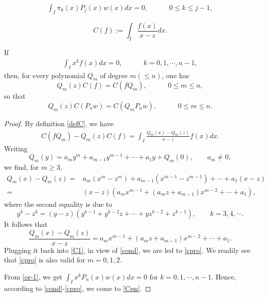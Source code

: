 \documentclass[10pt,a4paper]{amsart}
\begin{document}
\begin{align}\label{or-1}
\int_I\pi_k(x)P_{j}(x)w(x)dx=0, \quad\qquad 0\leq k\leq j-1,
\end{align}

	\begin{equation}\label{defC}		 C(f):=\int_{I}\frac{f(x)}{x-z}dx.
		\end{equation}

\begin{lemma}
If
\begin{align}\label{cond}
\int_{I}x^{k}f(x)dx=0,\quad\qquad k=0,1,\cdots,n-1,
\end{align}
then, for every polynomial $Q_{m}$ of degree $m (\le n)$, one has
	\begin{equation}\label{cpro}
	Q_{m}(z)C(f)=C(f Q_{m}),\quad\qquad 0\leq m\leq n,
	\end{equation}
so that
\begin{equation}\label{Cpn}
Q_{m}(z)C(P_nw)=C(Q_mP_{n}w),\quad\qquad 0\leq m\leq n.
\end{equation}

\end{lemma}

\begin{proof}
By definition \eqref{defC}, we have
\begin{align}\label{C1}
C(f Q_{m})-Q_{m}(z)C(f)=\int_{I}\frac{Q_m(x)-Q_m(z)}{x-z}f(x)dx.
\end{align}
Writing
 \[Q_m(y)=a_my^m+a_{m-1}y^{m-1}+\cdots+a_1y+Q_m(0),\qquad a_m\neq0,\]
we find, for $m\geq3$,
\begin{align*}
Q_m(x)-Q_m(z)=&a_m\left(x^m-z^m\right)+a_{m-1}(x^{m-1}-z^{m-1})+\cdots+a_1(x-z)\\
=&(x-z)\left(a_mx^{m-1}+(a_mz+a_{m-1})x^{m-2}+\cdots+a_1\right),
\end{align*}
where the second equality is due to
\[y^k-z^k=(y-z)(y^{k-1}+y^{k-2}z+\cdots+yz^{k-2}+z^{k-1}),\qquad k=3,4,\cdots.\]
It follows that
\[\frac{Q_m(x)-Q_m(z)}{x-z}=a_mx^{m-1}+(a_mz+a_{m-1})x^{m-2}+\cdots+a_1.\]
Plugging it back into \eqref{C1}, in view of \eqref{cond}, we are led to \eqref{cpro}. We readily see that \eqref{cpro} is also valid for $m=0,1,2$.

From \eqref{or-1}, we get
$\int_I x^kP_n(x)w(x)dx=0$ for $k=0,1,\cdots,n-1.$
Hence, according to \eqref{cond}-\eqref{cpro}, we come to \eqref{Cpn}.
\end{proof}
\end{document}
